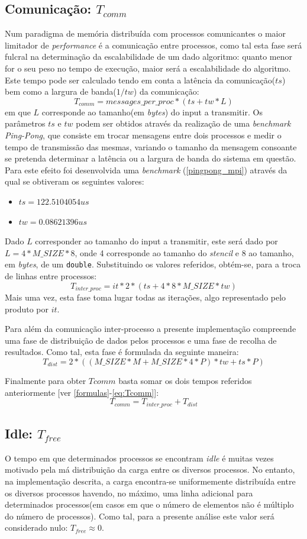 \documentclass{article}
\begin{document}
\subsection{Comunicação: $T_{comm}$}
Num paradigma de memória distribuída com processos comunicantes
o maior limitador de \textit{performance} é a comunicação entre processos, como tal esta 
fase será fulcral na determinação da escalabilidade de um dado algoritmo: quanto menor for o seu peso no tempo de execução, maior será a escalabilidade do algoritmo. Este tempo pode ser calculado tendo em conta a latência da comunicação($ts$) bem como a largura de banda($1/tw$) da comunicação: 
$$ T_{comm} = messages\_per\_proc * (ts + tw*L) $$ 
em que $L$ corresponde ao tamanho(em \textit{bytes}) do input a transmitir.
Os parâmetros $ts$ e $tw$ podem ser obtidos através da realização de uma \textit{benchmark Ping-Pong}, que consiste em trocar mensagens entre dois processos e medir o tempo de 
transmissão das mesmas, variando o tamanho da mensagem consoante se pretenda determinar a 
latência ou a largura de banda do sistema em questão.
Para este efeito foi desenvolvida uma \textit{benchmark} (\ref{pingpong_mpi}) através da 
qual se obtiveram os seguintes valores:
\begin{itemize}
    \item $ts=122.5104054 us$
    \item $tw=0.08621396 us$
\end{itemize}

Dado $L$ corresponder ao tamanho do input a transmitir, este será dado por $L=4*M\_SIZE*8$, 
onde 4 corresponde ao tamanho do \textit{stencil} e 8 ao tamanho, em \textit{bytes}, de 
um \texttt{double}. Substituindo os valores referidos, obtém-se, para a troca de linhas
entre processos:
$$T_{inter\_proc} = it*2*(ts+4*8*M\_SIZE*tw)$$
Mais uma vez, esta fase toma lugar todas as iterações, algo representado pelo produto
por $it$.

Para além da comunicação inter-processo a presente implementação compreende uma fase de 
distribuição de dados pelos processos e uma fase de recolha de resultados. Como tal, esta 
fase é formulada da seguinte maneira:
$$T_{dist} = 2*((M\_SIZE*M+M\_SIZE*4*P)*tw+ts*P)$$

Finalmente para obter $Tcomm$ basta somar os dois tempos referidos anteriormente [ver \ref{formulas}-\ref{eq:Tcomm}]:
$$T_{comm} = T_{inter\_proc} + T_{dist}$$


\subsection{Idle: $T_{free}$}
O tempo em que determinados processos se encontram \textit{idle} é muitas vezes motivado 
pela má distribuição da carga entre os diversos processos. No entanto, na implementação 
descrita, a carga encontra-se uniformemente distribuída entre os diversos processos
havendo, no máximo, uma linha adicional para determinados processos(em casos em que o 
número de elementos não é múltiplo do número de processos). Como tal, para a presente análise 
este valor será considerado nulo: 
$T_{free} \approx 0$.
\end{document}
